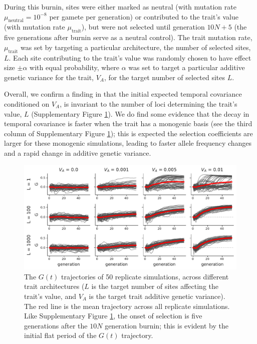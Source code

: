 \documentclass[11pt]{article}
\begin{document}
{\begin{figure}[!ht]
  \label{suppfig:sim-expfit-covs}
\end{figure}

During this burnin, sites were either marked as neutral (with mutation rate
$\mu_\mathrm{neutral} = 10^{-8}$ per gamete per generation) or contributed to
the trait's value (with mutation rate $\mu_\mathrm{trait}$), but were not
selected until generation $10N + 5$ (the five generations after burnin serve
as a neutral control). The trait mutation rate, $\mu_\mathrm{trait}$ was set by
targeting a particular architecture, the number of selected sites, $L$. Each
site contributing to the trait's value was randomly chosen to have effect size
$\pm \alpha$ with equal probability, where $\alpha$ was set to target a
particular additive genetic variance for the trait, $V_A$, for the target
number of selected sites $L$. 

Overall, we confirm a finding in \textcite{Buffalo2019-io} that the initial
expected temporal covariance conditioned on $V_A$, is invariant to the number
of loci determining the trait's value, $L$ (Supplementary Figure
\ref{suppfig:sim-expfit-covs}). We do find some evidence that the decay in
temporal covariance is faster when the trait has a monogenic basis (see the
third column of Supplementary Figure \ref{suppfig:sim-expfit-covs}); this is
expected the selection coefficients are larger for these monogenic simulations,
leading to faster allele frequency changes and a rapid change in additive
genetic variance. 

\begin{figure}[!ht]
  \centering
  \includegraphics[width=\textwidth]{figures/fig-architecture-G.pdf}

  \caption{The $G(t)$ trajectories of 50 replicate simulations, across
    different trait architectures ($L$ is the target number of sites affecting
    the trait's value, and $V_A$ is the target trait additive genetic
    variance). The red line is the mean trajectory across all replicate
  simulations. Like Supplementary Figure \ref{suppfig:sim-expfit-covs}, the
onset of selection is five generations after the $10N$ generation burnin; this
is evident by the initial flat period of the $G(t)$ trajectory.}


\end{figure}}
\end{document}
